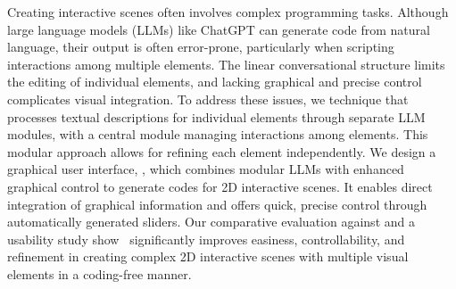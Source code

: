 Creating interactive 
scenes {often} involves complex programming tasks. Although large language models (LLMs) like ChatGPT can generate code 
from natural language, {their} %
output is often error-prone, particularly when scripting {interactions}
among multiple elements. The linear conversational structure limits {the editing of individual elements,}
{and lacking graphical and precise control}
complicates {visual integration.}
To address these issues, {we  technique that processes textual descriptions for individual elements through separate LLM modules, with a central module managing interactions {among elements.}}
{This modular approach allows for refining each element independently.} We design a graphical user interface, {\sysName}, which combines modular LLMs with enhanced graphical control to generate code{s} for {2D} interactive scenes. {It enables direct integration of graphical information and offers quick, precise control through automatically generated sliders.}
Our comparative evaluation against  %
{and}
a usability study show \sysName~significantly improves {easiness,}
controllability, and refinement in creating complex 2D {interactive scenes} %
with multiple visual elements {in a coding-free manner}.


